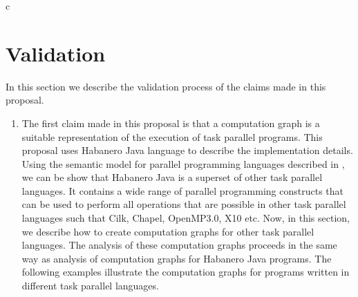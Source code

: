 c\section{Validation}

In this section we describe the validation process of the claims made in this proposal.

\begin{enumerate}
\item The first claim made in this proposal is that a computation graph is a suitable representation of the execution of task parallel programs. This proposal uses Habanero Java language to describe the implementation details. Using the semantic model for parallel programming languages described in \cite{bouajjani2012analysis}, we can be show that Habanero Java is a superset of other task parallel languages. It contains a wide range of parallel programming constructs that can be used to perform all operations that are possible in other task parallel languages such that Cilk, Chapel, OpenMP3.0, X10 etc. Now, in this section, we describe how to create computation graphs for other task parallel languages. The analysis of these computation graphs proceeds in the same way as analysis of computation graphs for Habanero Java programs. The following examples illustrate the computation graphs for programs written in different task parallel languages.


\end{enumerate}
